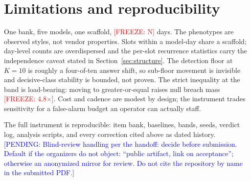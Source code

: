 \documentclass[conference]{IEEEtran}
\newcommand{\freeze}[1]{\textcolor{red}{[FREEZE: #1]}}
\newcommand{\pendingnote}[1]{\textcolor{blue}{[PENDING: #1]}}
\begin{document}
\section{Limitations and reproducibility}

One bank, five models, one scaffold, \freeze{N} days. The
phenotypes are observed styles, not vendor properties. Slots within
a model-day share a scaffold; day-level counts are overdispersed
and the per-slot recurrence statistics carry the independence
caveat stated in Section~\ref{sec:structure}. The detection floor
at $K=10$ is roughly a four-of-ten answer shift, so sub-floor
movement is invisible and decisive-class stability is bounded, not
proven. The strict inequality at the band is load-bearing: moving
to greater-or-equal raises null breach mass \freeze{4.8$\times$}.
Cost and cadence are modest by design; the instrument trades
sensitivity for a false-alarm budget an operator can actually
staff.

The full instrument is reproducible: item bank, baselines, bands,
seeds, verdict log, analysis scripts, and every correction cited
above as dated history. \pendingnote{Blind-review handling per the
handoff: decide before submission. Default if the organizers do not
object: ``public artifact, link on acceptance''; otherwise an
anonymized mirror for review. Do not cite the repository by name in
the submitted PDF.}



\end{document}
